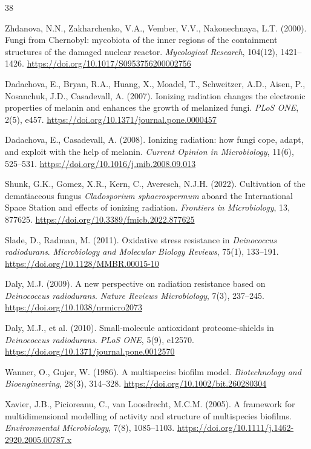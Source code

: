 \documentclass[11pt]{article}
\begin{document}
\begin{thebibliography}{38}

Zhdanova, N.N., Zakharchenko, V.A., Vember, V.V., Nakonechnaya, L.T. (2000).
Fungi from Chernobyl: mycobiota of the inner regions of the containment structures of the
damaged nuclear reactor.
\textit{Mycological Research}, 104(12), 1421--1426.
\url{https://doi.org/10.1017/S0953756200002756}

Dadachova, E., Bryan, R.A., Huang, X., Moadel, T., Schweitzer, A.D., Aisen, P.,
Nosanchuk, J.D., Casadevall, A. (2007).
Ionizing radiation changes the electronic properties of melanin and enhances the growth of
melanized fungi.
\textit{PLoS ONE}, 2(5), e457.
\url{https://doi.org/10.1371/journal.pone.0000457}

Dadachova, E., Casadevall, A. (2008).
Ionizing radiation: how fungi cope, adapt, and exploit with the help of melanin.
\textit{Current Opinion in Microbiology}, 11(6), 525--531.
\url{https://doi.org/10.1016/j.mib.2008.09.013}

Shunk, G.K., Gomez, X.R., Kern, C., Averesch, N.J.H. (2022).
Cultivation of the dematiaceous fungus \textit{Cladosporium sphaerospermum} aboard the
International Space Station and effects of ionizing radiation.
\textit{Frontiers in Microbiology}, 13, 877625.
\url{https://doi.org/10.3389/fmicb.2022.877625}

Slade, D., Radman, M. (2011).
Oxidative stress resistance in \textit{Deinococcus radiodurans}.
\textit{Microbiology and Molecular Biology Reviews}, 75(1), 133--191.
\url{https://doi.org/10.1128/MMBR.00015-10}

Daly, M.J. (2009).
A new perspective on radiation resistance based on \textit{Deinococcus radiodurans}.
\textit{Nature Reviews Microbiology}, 7(3), 237--245.
\url{https://doi.org/10.1038/nrmicro2073}

Daly, M.J., et al. (2010).
Small-molecule antioxidant proteome-shields in \textit{Deinococcus radiodurans}.
\textit{PLoS ONE}, 5(9), e12570.
\url{https://doi.org/10.1371/journal.pone.0012570}

Wanner, O., Gujer, W. (1986).
A multispecies biofilm model.
\textit{Biotechnology and Bioengineering}, 28(3), 314--328.
\url{https://doi.org/10.1002/bit.260280304}

Xavier, J.B., Picioreanu, C., van Loosdrecht, M.C.M. (2005).
A framework for multidimensional modelling of activity and structure of multispecies biofilms.
\textit{Environmental Microbiology}, 7(8), 1085--1103.
\url{https://doi.org/10.1111/j.1462-2920.2005.00787.x}


\end{thebibliography}
\end{document}

